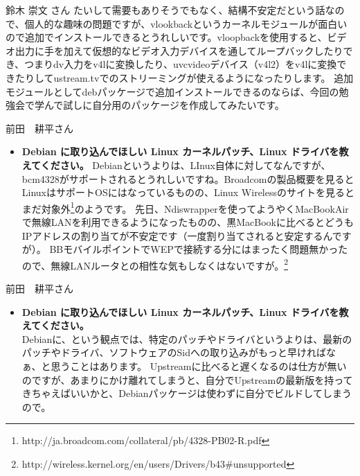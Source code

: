 \documentclass[cjk,dvipdfmx,12pt]{beamer}
\begin{document}
\begin{frame}{鈴木 崇文 さん}
たいして需要もありそうでもなく、結構不安定だという話なので、個人的な趣味の問題ですが、vlookbackというカーネルモジュールが面白いので追加でインストールできるとうれしいです。vloopbackを使用すると、ビデオ出力に手を加えて仮想的なビデオ入力デバイスを通してループバックしたりでき、つまりdv入力をv4lに変換したり、uvcvideoデバイス（v4l2）をv4lに変換できたりしてustream.tvでのストリーミングが使えるようになったりします。
追加モジュールとしてdebパッケージで追加インストールできるのならば、今回の勉強会で学んで試しに自分用のパッケージを作成してみたいです。
\end{frame}

\begin{frame}{前田　耕平さん}
\begin{itemize}
\item {\bf Debian に取り込んでほしい Linux カーネルパッチ、Linux ドライバを教えてください。}
Debianというよりは、LInux自体に対してなんですが、bcm4328がサポートされるとうれしいですね。Broadcomの製品概要を見るとLinuxはサポートOSにはなっているものの、Linux
Wirelessのサイトを見るとまだ対象外\footnote{http://ja.broadcom.com/collateral/pb/4328-PB02-R.pdf}のようです。
先日、Ndiswrapperを使ってようやくMacBookAirで無線LANを利用できるようになったものの、黒MacBookに比べるとどうもIPアドレスの割り当てが不安定です（一度割り当てされると安定するんですが）。
BBモバイルポイントでWEPで接続する分にはまったく問題無かったので、無線LANルータとの相性な気もしなくはないですが。\footnote{http://wireless.kernel.org/en/users/Drivers/b43\#unsupported}
\end{itemize}
\end{frame}

\begin{frame}{前田　耕平さん}
\begin{itemize}
\item {\bf Debian に取り込んでほしい Linux カーネルパッチ、Linux ドライバを教えてください。}
\\
Debianに、という観点では、特定のパッチやドライバというよりは、最新のパッチやドライバ、ソフトウェアのSidへの取り込みがもっと早ければなぁ、と思うことはあります。
Upstreamに比べると遅くなるのは仕方が無いのですが、あまりにかけ離れてしまうと、自分でUpstreamの最新版を持ってきちゃえばいいかと、Debianパッケージは使わずに自分でビルドしてしまうので。
\end{itemize}
\end{frame}
\end{document}
